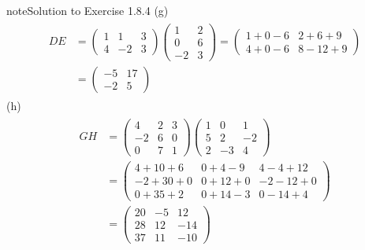 \documentclass[letterpaper,10pt,english]{jupyterBook}
\begin{document}
\begin{sphinxadmonition}{note}{Solution to Exercise 1.8.4}
\sphinxAtStartPar
(g)  
\begin{equation*}
\begin{split} \begin{align*}
    DE &= \begin{pmatrix} 1 & 1 & 3 \\ 4 & -2 & 3 \end{pmatrix} \begin{pmatrix} 1 & 2 \\ 0 & 6 \\ -2 & 3 \end{pmatrix} = \begin{pmatrix} 1 + 0 - 6 & 2 + 6 + 9 \\ 4 + 0 - 6 & 8 - 12 + 9 \end{pmatrix} \\
    &= \begin{pmatrix} -5 & 17 \\ -2 & 5 \end{pmatrix}
\end{align*} \end{split}
\end{equation*}
\sphinxAtStartPar
(h)  
\begin{equation*}
\begin{split} \begin{align*}
    GH &= \begin{pmatrix} 4 & 2 & 3 \\ -2 & 6 & 0 \\ 0 & 7 & 1 \end{pmatrix}
    \begin{pmatrix} 1 & 0 & 1 \\ 5 & 2 & -2 \\ 2 & -3 & 4 \end{pmatrix} \\
    &= \begin{pmatrix} 
        4 + 10 + 6 & 0 + 4 - 9 & 4 - 4 + 12 \\
        -2 + 30 + 0 & 0 + 12 + 0 & -2 - 12 + 0 \\
        0 + 35 + 2 & 0 + 14 - 3 & 0 - 14 + 4
    \end{pmatrix} \\
    &= \begin{pmatrix} 20 & -5 & 12 \\ 28 & 12 & -14 \\ 37 & 11 & -10 \end{pmatrix}
\end{align*} \end{split}

\end{equation*}
\end{sphinxadmonition}
\end{document}

